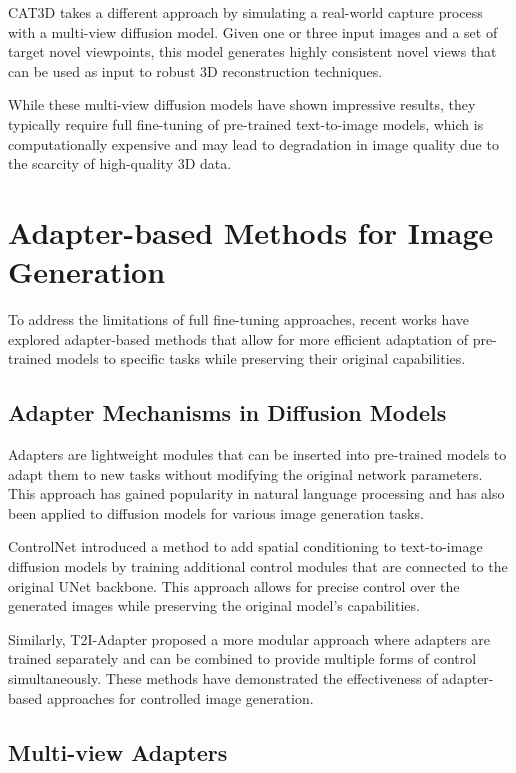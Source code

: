 CAT3D \cite{cat3d} takes a different approach by simulating a real-world capture process with a multi-view diffusion model. Given one or three input images and a set of target novel viewpoints, this model generates highly consistent novel views that can be used as input to robust 3D reconstruction techniques.

While these multi-view diffusion models have shown impressive results, they typically require full fine-tuning of pre-trained text-to-image models, which is computationally expensive and may lead to degradation in image quality due to the scarcity of high-quality 3D data.

\section{Adapter-based Methods for Image Generation}\label{sec:adapters}

To address the limitations of full fine-tuning approaches, recent works have explored adapter-based methods that allow for more efficient adaptation of pre-trained models to specific tasks while preserving their original capabilities.

\subsection{Adapter Mechanisms in Diffusion Models}

Adapters are lightweight modules that can be inserted into pre-trained models to adapt them to new tasks without modifying the original network parameters. This approach has gained popularity in natural language processing and has also been applied to diffusion models for various image generation tasks.

ControlNet \cite{controlnet} introduced a method to add spatial conditioning to text-to-image diffusion models by training additional control modules that are connected to the original UNet backbone. This approach allows for precise control over the generated images while preserving the original model's capabilities.

Similarly, T2I-Adapter \cite{t2iadapter} proposed a more modular approach where adapters are trained separately and can be combined to provide multiple forms of control simultaneously. These methods have demonstrated the effectiveness of adapter-based approaches for controlled image generation.

\subsection{Multi-view Adapters}

